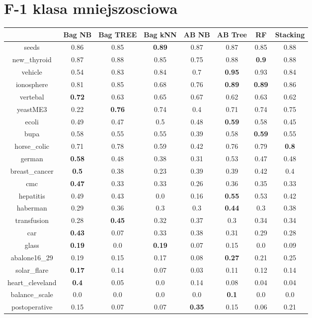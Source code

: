 \documentclass{article}%
\begin{document}
\section*{F{-}1 klasa mniejszosciowa}%
\begin{tabular}{c|ccccccc}%
&Bag NB&Bag TREE&Bag kNN&AB NB&AB Tree&RF&Stacking\\%
\hline%
seeds&0.86&0.85&\textbf{0.89}&0.87&0.87&0.85&0.88\\%
new\_thyroid&0.87&0.88&0.85&0.75&0.88&\textbf{0.9}&0.88\\%
vehicle&0.54&0.83&0.84&0.7&\textbf{0.95}&0.93&0.84\\%
ionosphere&0.81&0.85&0.68&0.76&\textbf{0.89}&\textbf{0.89}&0.86\\%
vertebal&\textbf{0.72}&0.63&0.65&0.67&0.62&0.63&0.62\\%
yeastME3&0.22&\textbf{0.76}&0.74&0.4&0.71&0.74&0.75\\%
ecoli&0.49&0.47&0.5&0.48&\textbf{0.59}&0.58&0.45\\%
bupa&0.58&0.55&0.55&0.39&0.58&\textbf{0.59}&0.55\\%
horse\_colic&0.71&0.78&0.59&0.42&0.76&0.79&\textbf{0.8}\\%
german&\textbf{0.58}&0.48&0.38&0.31&0.53&0.47&0.48\\%
breast\_cancer&\textbf{0.5}&0.38&0.23&0.39&0.39&0.42&0.4\\%
cmc&\textbf{0.47}&0.33&0.33&0.26&0.36&0.35&0.33\\%
hepatitis&0.49&0.43&0.0&0.16&\textbf{0.55}&0.53&0.42\\%
haberman&0.29&0.36&0.3&0.3&\textbf{0.44}&0.3&0.38\\%
transfusion&0.28&\textbf{0.45}&0.32&0.37&0.3&0.34&0.34\\%
car&\textbf{0.43}&0.07&0.33&0.38&0.31&0.29&0.28\\%
glass&\textbf{0.19}&0.0&\textbf{0.19}&0.07&0.15&0.0&0.09\\%
abalone16\_29&0.19&0.15&0.17&0.08&\textbf{0.27}&0.21&0.25\\%
solar\_flare&\textbf{0.17}&0.14&0.07&0.03&0.11&0.12&0.14\\%
heart\_cleveland&\textbf{0.4}&0.05&0.0&0.14&0.08&0.04&0.04\\%
balance\_scale&0.0&0.0&0.0&0.0&\textbf{0.1}&0.0&0.0\\%
postoperative&0.15&0.07&0.07&\textbf{0.35}&0.15&0.06&0.21\\%
\end{tabular}

%
\end{document}
